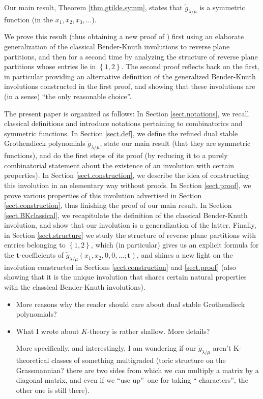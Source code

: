 \documentclass[numbers=enddot,12pt,final,onecolumn,notitlepage]{scrartcl}%
\theoremstyle{definition}
\newenvironment{todo}{}{}
\def\g{{\widetilde{g}}}
\def\t{{\mathbf{t}}}
\def\lm{{\lambda/\mu}}
\begin{document}
Our main result, Theorem \ref{thm.gtilde.symm}, states that
$\widetilde{g}_{\lambda/\mu}$ is a symmetric function (in the $x_{1}%
,x_{2},x_{3},\ldots$).

We prove this result (thus obtaining a new proof of
\cite[Theorem 9.1]{LamPyl}) first using an elaborate generalization
of the classical Bender-Knuth involutions to reverse plane partitions,
and then for a second time by analyzing the structure of reverse plane
partitions whose entries lie in $\left\{1, 2\right\}$. The second
proof reflects back on the first, in particular providing an
alternative definition of the generalized Bender-Knuth involutions
constructed in the first proof, and showing that these involutions
are (in a sense) ``the only reasonable choice''.

The present paper is organized as follows: In Section \ref{sect.notations}, we
recall classical definitions and introduce notations pertaining to
combinatorics and symmetric functions. In Section \ref{sect.def}, we define
the refined dual stable Grothendieck polynomials $\widetilde{g}_{\lambda/\mu}$, state
our main result (that they are symmetric functions), and do the first steps of
its proof (by reducing it to a purely combinatorial statement about the
existence of an involution with certain properties). In Section \ref{sect.construction}, we describe the idea of constructing this involution in an elementary way without proofs. In Section
\ref{sect.proof}, we prove various properties of this involution advertised in Section \ref{sect.construction}, thus finishing the proof of our main result. In Section \ref{sect.BKclassical}, we
recapitulate the definition of the classical Bender-Knuth involution, and
show that our involution is a generalization of the latter.
Finally, in Section \ref{sect.structure} we study the structure of
reverse plane partitions with entries belonging to $\left\{1, 2\right\}$,
which (in particular) gives us an explicit formula for the
$\mathbf{t}$-coefficients of $\g_\lm(x_1,x_2,0,0,\dots;\t)$, and shines
a new light on the involution constructed in Sections \ref{sect.construction}
and \ref{sect.proof}
(also showing that it is the unique involution that shares certain natural
properties with the classical Bender-Knuth involutions).

\begin{todo}
\begin{itemize}
\item More reasons why the reader should
care about dual stable Grothendieck polynomials?

\item What I wrote about $K$-theory is rather shallow. More details?

More specifically, and interestingly, I am wondering if our $\widetilde{g}%
_{\lambda/\mu}$ aren't K-theoretical classes of something multigraded (toric
structure on the Grassmannian? there are two sides from which we can multiply
a matrix by a diagonal matrix, and even if we \textquotedblleft use
up\textquotedblright\ one for taking \textquotedblleft
characters\textquotedblright, the other one is still there).
\end{itemize}
\end{todo}
\end{document}
